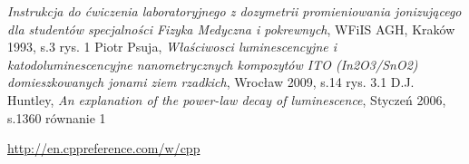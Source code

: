 \begin{thebibliography}{wstep,technologie}

  \emph{Instrukcja do ćwiczenia laboratoryjnego z dozymetrii promieniowania jonizującego dla
studentów specjalności Fizyka Medyczna i pokrewnych}, WFiIS AGH, Kraków 1993, s.3 rys. 1
Piotr Psuja,
\emph{Właściwosci luminescencyjne i katodoluminescencyjne
nanometrycznych kompozytów ITO (In2O3/SnO2)
domieszkowanych jonami ziem rzadkich}, Wrocław 2009, s.14 rys. 3.1
D.J. Huntley,
\emph{An explanation of the power-law decay of
luminescence}, Styczeń 2006, s.1360 równanie 1

\url{http://en.cppreference.com/w/cpp}


\end{thebibliography}

